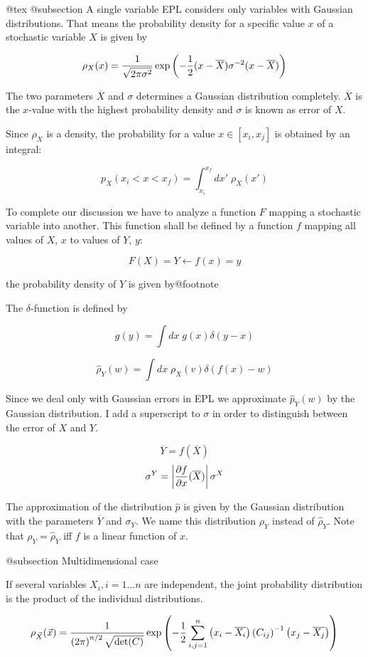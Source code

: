 @tex
@subsection A single variable
EPL considers only variables with Gaussian distributions. That means the
probability density for a specific value $x$ of a stochastic variable
$X$ is given by 

$$ \rho_{X}(x)={1 \over \sqrt{2\pi\sigma^2}}
  \exp\left(-{1 \over 2} (x-\overline{X}) \sigma^{-2} 
                        (x-\overline{X}) \right) $$

The two parameters $\overline{X}$ and $\sigma$ determines a Gaussian 
distribution completely. $\overline{X}$ is the $x$-value with the
highest probability density and $\sigma$ is known as error of $X$.

Since $\rho_{X}$ is a density, the probability for a value
$x\in[x_i,x_j]$ is obtained by an integral:

$$p_{X}(x_i<x<x_f)=\int_{x_i}^{x_f} dx' \; \rho_{X}(x')$$

To complete our discussion we have to analyze a function $F$ mapping a
stochastic variable into another. This function shall be defined by
a function $f$ mapping all values of $X$, $x$ to values of $Y$, $y$:

$$ F(X)=Y \leftarrow f(x)=y$$

the probability density of $Y$ is given by@footnote{The
$\delta$-function is defined by 

$$ g(y)=\int dx \; g(x) \delta(y-x)$$
}

$$ \widehat{\rho}_{Y}(w) =\int dx \; \rho_{X}(v) \delta(f(x)-w)$$

Since we deal only with Gaussian errors in EPL we approximate $\widehat{p}_{Y}(w)$
by the Gaussian distribution. I add a superscript to $\sigma$ in order to 
distinguish between the error of $X$ and $Y$.

$$ \overline{Y}=f(\overline{X})$$
$$ \sigma^{Y} = \left| {\partial f \over \partial x}(\overline{X}) \right|
                \sigma^{X}$$

The approximation of the distribution $\widehat{p}$ is given by the Gaussian
distribution with the parameters $\overline{Y}$ and $\sigma_Y$. We
name this distribution $\rho_{Y}$ instead of $\widehat{\rho}_{Y}$. Note that
$\rho_{Y} = \widehat{\rho}_{Y}$ iff $f$ is a linear function of $x$.

@subsection Multidimensional case

If several variables $X_i, i=1\ldots n$ are independent,
the joint probability distribution is the product of the 
individual distributions.

$$ \rho_{\vec{X}}(\vec{x})=
  {1 \over \left(2\pi\right)^{n/2} \sqrt{\det(C)}} 
     \exp\left(-{1 \over 2} \sum_{i,j=1}^n 
      \left(x_i-\overline{X_i}\right) 
                \left(C_{ij}\right)^{-1} 
      \left(x_j-\overline{X_j}\right) \right) $$

